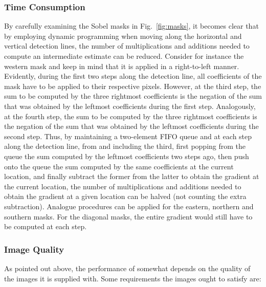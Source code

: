 \subsubsection{Time Consumption}

By carefully examining the Sobel masks in Fig.~\ref{fig:masks}, it
becomes clear that by employing dynamic programming when moving along
the horizontal and vertical detection lines, the number of
multiplications and additions needed to compute an intermediate
estimate can be reduced.  Consider for instance the western mask and
keep in mind that it is applied in a right-to-left manner.  Evidently,
during the first two steps along the detection line, all coefficients
of the mask have to be applied to their respective pixels.  However,
at the third step, the sum to be computed by the three rightmost
coefficients is the negation of the sum that was obtained by the
leftmost coefficients during the first step.  Analogously, at the
fourth step, the sum to be computed by the three rightmost
coefficients is the negation of the sum that was obtained by the
leftmost coefficients during the second step.  Thus, by maintaining a
two-element FIFO queue and at each step along the detection line, from
and including the third, first popping from the queue the sum computed
by the leftmost coefficients two steps ago, then push onto the queue
the sum computed by the same coefficients at the current location, and
finally subtract the former from the latter to obtain the gradient at
the current location, the number of multiplications and additions
needed to obtain the gradient at a given location can be halved (not
counting the extra subtraction).  Analogue procedures can be applied
for the eastern, northern and southern masks.  For the diagonal masks,
the entire gradient would still have to be computed at each step.

\subsubsection{Image Quality}

As pointed out above, the performance of {\octopus} somewhat depends
on the quality of the images it is supplied with.  Some requirements
the images ought to satisfy are:

